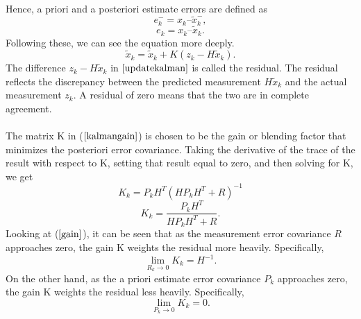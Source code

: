 \documentclass[a4paper,10pt]{report}
\begin{document}
\paragraph*{}
Hence, a priori and a posteriori estimate errors are defined as
\begin{equation}
e_k^- = x_k – \tilde x_k^- ,
\end{equation}
\begin{equation}
e_k =  x_k – \tilde x_k.
\end{equation}
Following these, we can see the equation more deeply.
\begin{equation}
\tilde x_k = \tilde x_k + K(z_k-H\tilde x_k).
\label{updatekalman}
\end{equation}
The difference $z_k - H\tilde x_k$ in $\ref{updatekalman}$ is called the residual. The residual reflects the discrepancy between the
predicted measurement $H\tilde x_k$ and the actual measurement $z_k$. A residual of zero means that the two are in complete
agreement. \paragraph*{}
The matrix K in ($\ref{kalmangain}$) is chosen to be the gain or blending factor that minimizes the posteriori error covariance. Taking the derivative of the trace of the result with respect to K, setting that result equal to zero, and then solving for K, we get
\begin{equation}
K_k = P_kH^{T}(HP_kH^{T} + R)^{-1}
\end{equation}
\begin{equation}
K_k = \frac{P_kH^T}{HP_kH^T + R}.
\label{gain}
\end{equation}
Looking at ($\ref{gain}$), it can be seen that as the measurement error covariance $R$ approaches zero, the gain K weights the residual more
heavily. Specifically,
\begin{equation}
\mathop {\lim }\limits_{R_k \to 0 } {K_k} = H^{-1}.
\end{equation}
On the other hand, as the a priori estimate error covariance $P_k$ approaches zero, the gain K weights the residual less heavily. Specifically,
\begin{equation}
\mathop {\lim }\limits_{P_k \to 0 } {K_k} = 0.
\end{equation}
\end{document}
